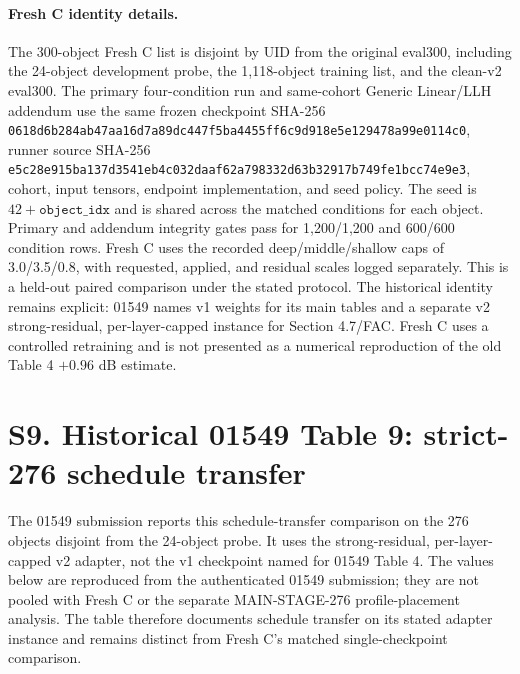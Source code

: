 \documentclass[11pt]{article}
\begin{document}
\paragraph{Fresh C identity details.} The 300-object Fresh C list is disjoint by UID from the original eval300, including the 24-object development probe, the 1,118-object training list, and the clean-v2 eval300. The primary four-condition run and same-cohort Generic Linear/LLH addendum use the same frozen checkpoint SHA-256 \texttt{0618d6b2\allowbreak{}84ab47aa\allowbreak{}16d7a89d\allowbreak{}c447f5ba\allowbreak{}4455ff6c\allowbreak{}9d918e5e\allowbreak{}129478a9\allowbreak{}9e0114c0}, runner source SHA-256 \texttt{e5c28e915ba137d3541eb4c032daaf62a798332d63b32917b749fe1bcc74e9e3}, cohort, input tensors, endpoint implementation, and seed policy. The seed is $42+\texttt{object\_idx}$ and is shared across the matched conditions for each object. Primary and addendum integrity gates pass for 1,200/1,200 and 600/600 condition rows. Fresh C uses the recorded deep/middle/shallow caps of 3.0/3.5/0.8, with requested, applied, and residual scales logged separately. This is a held-out paired comparison under the stated protocol. The historical identity remains explicit: 01549 names v1 weights for its main tables and a separate v2 strong-residual, per-layer-capped instance for Section 4.7/FAC. Fresh C uses a controlled retraining and is not presented as a numerical reproduction of the old Table 4 $+0.96$ dB estimate.
\section*{S9. Historical 01549 Table 9: strict-276 schedule transfer}

The 01549 submission reports this schedule-transfer comparison on the 276 objects disjoint from the 24-object probe. It uses the strong-residual, per-layer-capped v2 adapter, not the v1 checkpoint named for 01549 Table 4. The values below are reproduced from the authenticated 01549 submission; they are not pooled with Fresh C or the separate MAIN-STAGE-276 profile-placement analysis. The table therefore documents schedule transfer on its stated adapter instance and remains distinct from Fresh C's matched single-checkpoint comparison.
\end{document}
